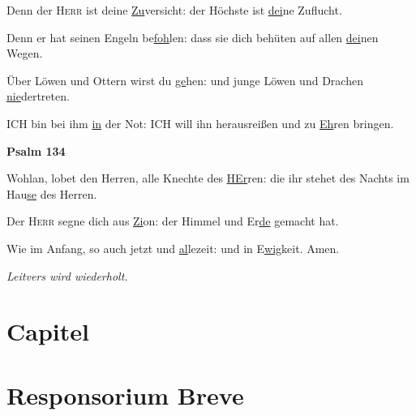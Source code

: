 \begin{multicols}{2}
 Denn der \textsc{Herr} ist deine \underline{Zu}versicht: \grestar{} der Höchste ist \underline{dei}ne Zuflucht.\par
 Denn er hat seinen Engeln be\underline{foh}len: \grestar{} dass sie dich behüten auf allen \underline{dei}nen Wegen.\par
 Über Löwen und Ottern wirst du \underline{ge}hen: \grestar{} und junge Löwen und Drachen \underline{nie}dertreten.\par
 ICH bin bei ihm \underline{in} der Not: \grestar{} ICH will ihn herausreißen und zu \underline{Eh}ren bringen.\par
 \textbf{Psalm 134}\par
 Wohlan, lobet den Herren, alle Knechte des \underline{HEr}ren: \grestar{} die ihr stehet des Nachts im Hau\underline{se} des Herren.\par
 Der \textsc{Herr} segne dich aus \underline{Zi}on: \grestar{} der Himmel und Er\underline{de} gemacht hat.\par
  Wie im Anfang, so auch jetzt und \underline{al}lezeit: \grestar{} und in E\underline{wig}keit. Amen.\par
 \textit{Leitvers wird wiederholt.}
\end{multicols}
 \newpage
\section*{Capitel}
\section*{Responsorium Breve}
\newpage
